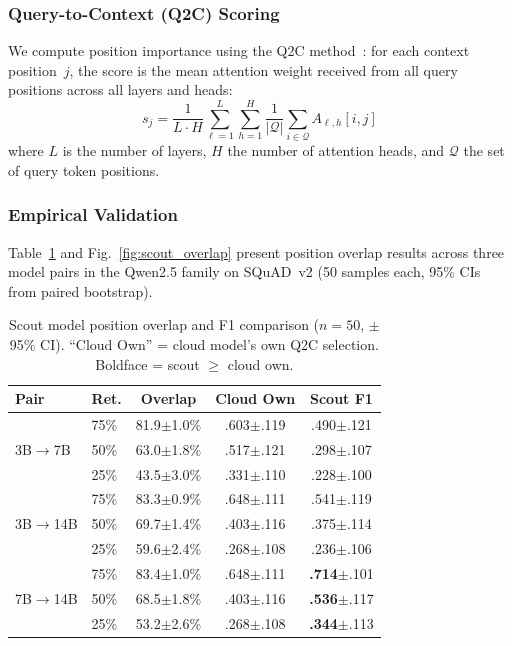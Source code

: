 \documentclass[conference]{IEEEtran}
\newcommand{\QtoC}{\textsc{Q2C}\xspace}
\begin{document}
\subsubsection{Query-to-Context (Q2C) Scoring}

We compute position importance using the \QtoC method~\cite{paperA}: for each context position~$j$, the score is the mean attention weight received from all query positions across all layers and heads:
\begin{equation}
    s_j = \frac{1}{L \cdot H} \sum_{\ell=1}^{L} \sum_{h=1}^{H} \frac{1}{|\mathcal{Q}|} \sum_{i \in \mathcal{Q}} A_{\ell,h}[i, j]
    \label{eq:q2c}
\end{equation}
where $L$ is the number of layers, $H$ the number of attention heads, and $\mathcal{Q}$ the set of query token positions.

\subsubsection{Empirical Validation}

Table~\ref{tab:scout_overlap} and Fig.~\ref{fig:scout_overlap} present position overlap results across three model pairs in the Qwen2.5 family on SQuAD~v2 (50 samples each, 95\% CIs from paired bootstrap).

\begin{table}[t]
\centering
\caption{Scout model position overlap and F1 comparison ($n = 50$, $\pm$ 95\% CI). ``Cloud Own'' = cloud model's own Q2C selection. Boldface = scout $\geq$ cloud own.}
\label{tab:scout_overlap}
\small
\begin{tabular}{@{}llccc@{}}
\toprule
\textbf{Pair} & \textbf{Ret.} & \textbf{Overlap} & \textbf{Cloud Own} & \textbf{Scout F1} \\
\midrule
\multirow{3}{*}{3B$\to$7B}
  & 75\% & 81.9$\pm$1.0\% & .603$\pm$.119 & .490$\pm$.121 \\
  & 50\% & 63.0$\pm$1.8\% & .517$\pm$.121 & .298$\pm$.107 \\
  & 25\% & 43.5$\pm$3.0\% & .331$\pm$.110 & .228$\pm$.100 \\
\midrule
\multirow{3}{*}{3B$\to$14B}
  & 75\% & 83.3$\pm$0.9\% & .648$\pm$.111 & .541$\pm$.119 \\
  & 50\% & 69.7$\pm$1.4\% & .403$\pm$.116 & .375$\pm$.114 \\
  & 25\% & 59.6$\pm$2.4\% & .268$\pm$.108 & .236$\pm$.106 \\
\midrule
\multirow{3}{*}{7B$\to$14B}
  & 75\% & 83.4$\pm$1.0\% & .648$\pm$.111 & \textbf{.714}$\pm$.101 \\
  & 50\% & 68.5$\pm$1.8\% & .403$\pm$.116 & \textbf{.536}$\pm$.117 \\
  & 25\% & 53.2$\pm$2.6\% & .268$\pm$.108 & \textbf{.344}$\pm$.113 \\
\bottomrule
\end{tabular}
\end{table}
\end{document}
